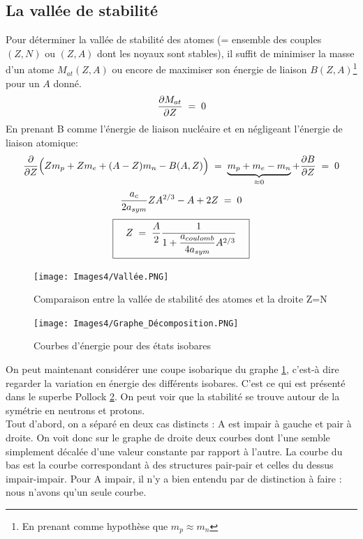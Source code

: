 \subsection{La vallée de stabilité}


Pour déterminer la vallée de stabilité des atomes (= ensemble des couples $(Z,N)$ ou $(Z,A)$ dont les noyaux sont stables), il suffit de minimiser la masse d'un atome $M_{at}(Z,A)$ ou encore de maximiser son énergie de liaison $B(Z,A)$\footnote{En prenant comme hypothèse que $m_p \approx m_n$} pour un $A$ donné.
\begin{equation*}
    \dfrac{\partial M_{at}}{\partial Z} \; = \; 0
\end{equation*}
En prenant B comme l'énergie de liaison nucléaire et en négligeant l'énergie de liaison atomique:
\begin{equation*}
    \dfrac{\partial}{\partial Z}\Big(Zm_p + Zm_e + (A-Z)m_n -B(A,Z)\Big) 
    \; = \; \underbrace{m_p + m_e - m_n}_{\approx 0} + \dfrac{\partial B}{\partial Z}
    \; = \; 0
\end{equation*}
\begin{equation*}
    \dfrac{a_c}{2a_{sym}}Z A^{2/3} - A + 2Z \; = \; 0
\end{equation*}
\begin{equation*}
    \boxed{\quad
        Z \; = \; \dfrac{A}{2} \dfrac{1}{1 + \dfrac{a_{coulomb}}{4a_{sym}}A^{2/3}}\quad
    }
\end{equation*}
\begin{figure}[H]
    \centering
    \texttt{[image: Images4/Vallée.PNG]}
    \caption{Comparaison entre la vallée de stabilité des atomes et la droite Z=N}
    \label{vallee}
\end{figure}
\begin{figure}[H]
    \centering
    \texttt{[image: Images4/Graphe\_Décomposition.PNG]}
    \caption{Courbes d'énergie pour des états isobares}
    \label{decomp_noyau}
\end{figure}
On peut maintenant considérer une coupe isobarique du graphe \ref{vallee}, c'est-à dire regarder la variation en énergie des différents isobares. C'est ce qui est présenté dans le superbe Pollock \ref{decomp_noyau}. On peut voir que la stabilité se trouve autour de la symétrie en neutrons et protons.\\

Tout d'abord, on a séparé en deux cas distincts : A est impair à gauche et pair à droite. On voit donc sur le graphe de droite deux courbes dont l'une semble simplement décalée d'une valeur constante par rapport à l'autre. La courbe du bas est la courbe correspondant à des structures pair-pair et celles du dessus impair-impair. Pour A impair, il n'y a bien entendu par de distinction à faire : nous n'avons qu'un seule courbe.\\

